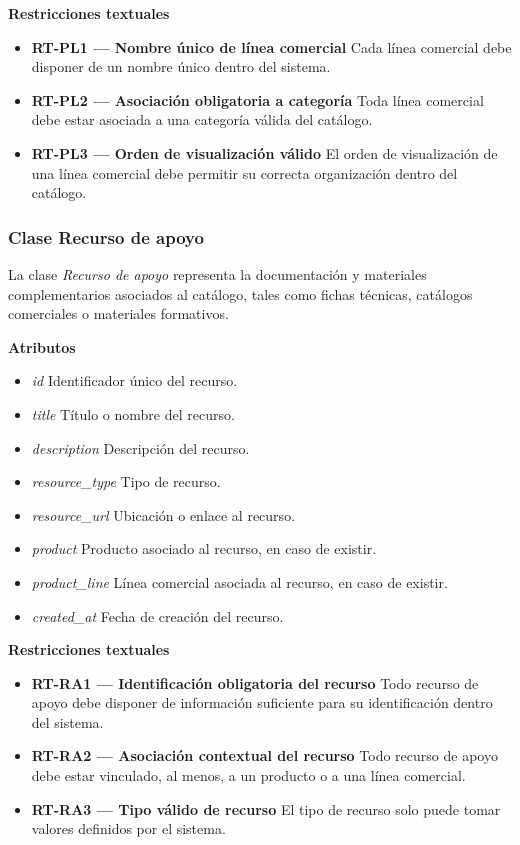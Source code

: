 \textbf{Restricciones textuales}

\begin{itemize}
      \item \textbf{RT-PL1 — Nombre único de línea comercial}
            Cada línea comercial debe disponer de un nombre único dentro del sistema.
      \item \textbf{RT-PL2 — Asociación obligatoria a categoría}
            Toda línea comercial debe estar asociada a una categoría válida del catálogo.
      \item \textbf{RT-PL3 — Orden de visualización válido}
            El orden de visualización de una línea comercial debe permitir su correcta organización dentro del catálogo.
\end{itemize}

\subsubsection{Clase Recurso de apoyo}

La clase \textit{Recurso de apoyo} representa la documentación y materiales complementarios asociados al catálogo, tales como fichas técnicas, catálogos comerciales o materiales formativos.

\textbf{Atributos}

\begin{itemize}
      \item \textit{id}
            Identificador único del recurso.
      \item \textit{title}
            Título o nombre del recurso.
      \item \textit{description}
            Descripción del recurso.
      \item \textit{resource\_type}
            Tipo de recurso.
      \item \textit{resource\_url}
            Ubicación o enlace al recurso.
      \item \textit{product}
            Producto asociado al recurso, en caso de existir.
      \item \textit{product\_line}
            Línea comercial asociada al recurso, en caso de existir.
      \item \textit{created\_at}
            Fecha de creación del recurso.
\end{itemize}

\textbf{Restricciones textuales}

\begin{itemize}
      \item \textbf{RT-RA1 — Identificación obligatoria del recurso}
            Todo recurso de apoyo debe disponer de información suficiente para su identificación dentro del sistema.
      \item \textbf{RT-RA2 — Asociación contextual del recurso}
            Todo recurso de apoyo debe estar vinculado, al menos, a un producto o a una línea comercial.
      \item \textbf{RT-RA3 — Tipo válido de recurso}
            El tipo de recurso solo puede tomar valores definidos por el sistema.
\end{itemize}

